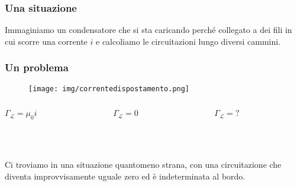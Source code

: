 \documentclass[]{beamer}
\theoremstyle{plain}
\begin{document}
\begin{frame}
  \frametitle{Una situazione}
  Immaginiamo un condensatore che si sta caricando perché collegato a dei fili in cui scorre una corrente $ i $ e calcoliamo le circuitazioni lungo diversi cammini.\pause
{}
\end{frame}




\begin{frame}
  \frametitle{Un problema}
  \begin{figure}
  \texttt{[image: img/correntedispostamento.png]}
  \end{figure}
  \begin{columns}
\begin{column}{0.33\textwidth}
\begin{center}
{\footnotesize $ \Gamma_\mathscr{L} =  \mu_0 i $}
\end{center}
\end{column}
\begin{column}{0.33\textwidth}
\begin{center}
{\footnotesize $ \Gamma_\mathscr{L} =  0 $}
\end{center}
\end{column}
\begin{column}{0.33\textwidth}
\begin{center}
{\footnotesize $ \Gamma_\mathscr{L} =  ? $}
\end{center}
\end{column}
\end{columns}
~\\~\\
Ci troviamo in una situazione quantomeno strana, con una circuitazione che diventa improvvisamente uguale zero ed è indeterminata al bordo.
\end{frame}
\end{document}
